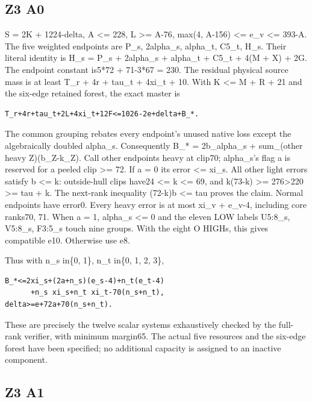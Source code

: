 \documentclass[11pt,a4paper]{article}
\begin{document}
\hypertarget{z3-a0}{%
\subsection{Z3 A0}\label{z3-a0}}

S = 2K + 1224-delta, A \textless= 228, L \textgreater= A-76, max(4,
A-156) \textless= e\_v \textless= 393-A. The five weighted endpoints are
P\_s, 2alpha\_s, alpha\_t, C5\_t, H\_s. Their literal identity is H\_s =
P\_s + 2alpha\_s + alpha\_t + C5\_t + 4(M + X) + 2G. The endpoint
constant is5*72 + 71-3*67 = 230. The residual physical source mass is at
least T\_r + 4r + tau\_t + 4xi\_t + 10. With K \textless= M + R + 21 and
the six-edge retained forest, the exact master is

\begin{verbatim}
T_r+4r+tau_t+2L+4xi_t+12F<=1026-2e+delta+B_*.
\end{verbatim}

The common grouping rebates every endpoint's unused native loss except
the algebraically doubled alpha\_s. Consequently B\_* = 2b\_alpha\_s +
sum\_(other heavy Z)(b\_Z-k\_Z). Call other endpoints heavy at clip70;
alpha\_s's flag a is reserved for a peeled clip \textgreater= 72. If a =
0 its error \textless= xi\_s. All other light errors satisfy b
\textless= k: outside-hull clips have24 \textless= k \textless= 69, and
k(73-k) \textgreater= 276\textgreater220 \textgreater= tau + k. The
next-rank inequality (72-k)b \textless= tau proves the claim. Normal
endpoints have error0. Every heavy error is at most xi\_v + e\_v-4,
including core ranks70, 71. When a = 1, alpha\_s \textless= 0 and the
eleven LOW labels U5:8\_s, V5:8\_s, F3:5\_s touch nine groups. With the
eight O HIGHs, this gives compatible e10. Otherwise use e8.

Thus with n\_s in\{0, 1\}, n\_t in\{0, 1, 2, 3\},

\begin{verbatim}
B_*<=2xi_s+(2a+n_s)(e_s-4)+n_t(e_t-4)
      +n_s xi_s+n_t xi_t-70(n_s+n_t),
delta>=e+72a+70(n_s+n_t).
\end{verbatim}

These are precisely the twelve scalar systems exhaustively checked by
the full-rank verifier, with minimum margin65. The actual five resources
and the six-edge forest have been specified; no additional capacity is
assigned to an inactive component.

\hypertarget{z3-a1}{%
\subsection{Z3 A1}\label{z3-a1}}
\end{document}
